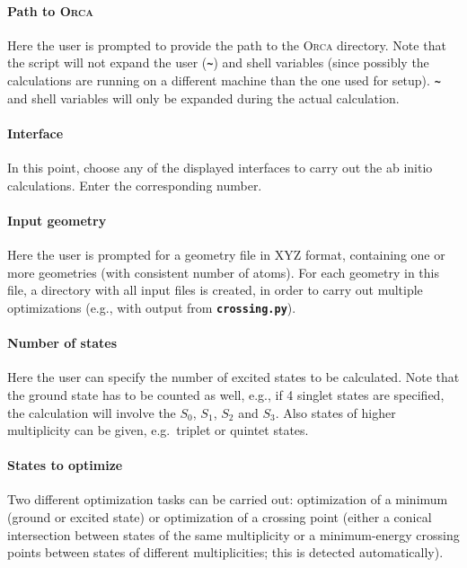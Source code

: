 \documentclass[a4paper,10pt,DIV=15,openany]{scrbook}
\newcommand{\ttt}[1]{\textbf{\texttt{#1}}}
\begin{document}
\paragraph{Path to \textsc{Orca}}

Here the user is prompted to provide the path to the \textsc{Orca} directory. Note that the script will not expand the user (\ttt{\textasciitilde}) and shell variables (since possibly the calculations are running on a different machine than the one used for setup). \ttt{\textasciitilde} and shell variables will only be expanded during the actual calculation.

\paragraph{Interface}

In this point, choose any of the displayed interfaces to carry out the ab initio calculations. Enter the corresponding number. 

\paragraph{Input geometry}

Here the user is prompted for a geometry file in XYZ format, containing one or more geometries (with consistent number of atoms).
For each geometry in this file, a directory with all input files is created, in order to carry out multiple optimizations (e.g., with output from \ttt{crossing.py}).

\paragraph{Number of states}

Here the user can specify the number of excited states to be calculated. Note that the ground state has to be counted as well, e.g., if 4 singlet states are specified, the calculation will involve the $S_0$, $S_1$, $S_2$ and $S_3$. Also states of higher multiplicity can be given, e.g.\ triplet or quintet states. 

\paragraph{States to optimize}

Two different optimization tasks can be carried out: optimization of a minimum (ground or excited state) or optimization of a crossing point (either a conical intersection between states of the same multiplicity or a minimum-energy crossing points between states of different multiplicities; this is detected automatically).
\end{document}
